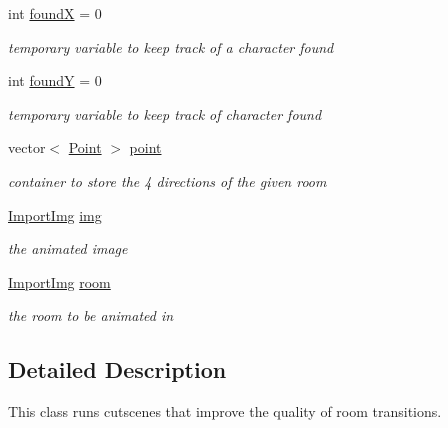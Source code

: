 \begin{DoxyCompactItemize}
int \hyperlink{classCutscene_a829a69db5263fd8e0915a9b905c386d0}{found\-X} = 0
\begin{DoxyCompactList}\small\item\em temporary variable to keep track of a character found \end{DoxyCompactList}\item 
int \hyperlink{classCutscene_ac77c836201afb1a31547c6c930e323d4}{found\-Y} = 0
\begin{DoxyCompactList}\small\item\em temporary variable to keep track of character found \end{DoxyCompactList}\item 
vector$<$ \hyperlink{structCutscene_1_1Point}{Point} $>$ \hyperlink{classCutscene_a7438465af0e7bc51d52ca5aaefc97e3b}{point}
\begin{DoxyCompactList}\small\item\em container to store the 4 directions of the given room \end{DoxyCompactList}\item 
\hyperlink{classImportImg}{Import\-Img} \hyperlink{classCutscene_ae40582568add2f44e099d4a8978f41d4}{img}
\begin{DoxyCompactList}\small\item\em the animated image \end{DoxyCompactList}\item 
\hyperlink{classImportImg}{Import\-Img} \hyperlink{classCutscene_a033c0715f32be9730d3692e57fe17096}{room}
\begin{DoxyCompactList}\small\item\em the room to be animated in \end{DoxyCompactList}\end{DoxyCompactItemize}


\subsection{Detailed Description}
This class runs cutscenes that improve the quality of room transitions. 

